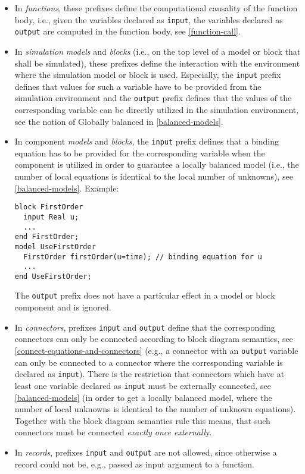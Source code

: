 \begin{itemize}
\item
  In \emph{functions}, these prefixes define the computational causality
  of the function body, i.e., given the variables declared as \lstinline!input!, the
  variables declared as \lstinline!output! are computed in the function body, see
  \autoref{function-call}.
\item
  In \emph{simulation} \emph{models} and \emph{blocks} (i.e., on the top
  level of a model or block that shall be simulated), these prefixes
  define the interaction with the environment where the simulation model
  or block is used. Especially, the \lstinline!input! prefix defines that values for
  such a variable have to be provided from the simulation environment
  and the \lstinline!output! prefix defines that the values of the corresponding
  variable can be directly utilized in the simulation environment, see
  the notion of Globally balanced in \autoref{balanced-models}.
\item
  In component \emph{models} and \emph{blocks}, the \lstinline!input! prefix defines
  that a binding equation has to be provided for the corresponding
  variable when the component is utilized in order to guarantee a
  locally balanced model (i.e., the number of local equations is
  identical to the local number of unknowns), see \autoref{balanced-models}. Example:

\begin{lstlisting}[language=modelica]
block FirstOrder
  input Real u;
  ...
end FirstOrder;
model UseFirstOrder
  FirstOrder firstOrder(u=time); // binding equation for u
  ...
end UseFirstOrder;
\end{lstlisting}

The \lstinline!output! prefix does not have a particular effect in a model or block
component and is ignored.
\item
  In \emph{connectors}, prefixes \lstinline!input! and \lstinline!output! define that the
  corresponding connectors can only be connected according to block
  diagram semantics, see \autoref{connect-equations-and-connectors} (e.g., a connector with an \lstinline!output!
  variable can only be connected to a connector where the corresponding
  variable is declared as \lstinline!input!). There is the restriction that
  connectors which have at least one variable declared as \lstinline!input! must be
  externally connected, see \autoref{balanced-models} (in order to get a locally
  balanced model, where the number of local unknowns is identical to the
  number of unknown equations). Together with the block diagram
  semantics rule this means, that such connectors must be connected
  \emph{exactly once externall}y.
\item
  In \emph{records}, prefixes \lstinline!input! and \lstinline!output! are not allowed, since
  otherwise a record could not be, e.g., passed as input argument to a
  function.
\end{itemize}

